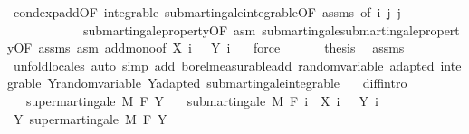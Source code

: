 \begin{isabellebody}
\ cond{\isacharunderscore}{\kern0pt}exp{\isacharunderscore}{\kern0pt}add{\isacharbrackleft}{\kern0pt}OF\ integrable\ submartingale{\isachardot}{\kern0pt}integrable{\isacharbrackleft}{\kern0pt}OF\ assms{\isacharbrackright}{\kern0pt}{\isacharcomma}{\kern0pt}\ of\ i\ j\ j{\isacharbrackright}{\kern0pt}\ \isanewline
\ \ \ \ \ \ \ \ \ \ \ \ submartingale{\isacharunderscore}{\kern0pt}property{\isacharbrackleft}{\kern0pt}OF\ asm{\isacharbrackright}{\kern0pt}\ submartingale{\isachardot}{\kern0pt}submartingale{\isacharunderscore}{\kern0pt}property{\isacharbrackleft}{\kern0pt}OF\ assms\ asm{\isacharbrackright}{\kern0pt}\ add{\isacharunderscore}{\kern0pt}mono{\isacharbrackleft}{\kern0pt}of\ {\isachardoublequoteopen}X\ i\ {\isacharunderscore}{\kern0pt}{\isachardoublequoteclose}\ {\isacharunderscore}{\kern0pt}\ {\isachardoublequoteopen}Y\ i\ {\isacharunderscore}{\kern0pt}{\isachardoublequoteclose}{\isacharbrackright}{\kern0pt}\ \isamarkupfalse%
\ force\isanewline
\ \ \isacommand{{\isacharbraceright}{\kern0pt}}\isamarkupfalse%
\isanewline
\ \ \isamarkupfalse%
\ {\isacharquery}{\kern0pt}thesis\ \isamarkupfalse%
\ assms\ \isamarkupfalse%
\ {\isacharparenleft}{\kern0pt}unfold{\isacharunderscore}{\kern0pt}locales{\isacharparenright}{\kern0pt}\ {\isacharparenleft}{\kern0pt}auto\ simp\ add{\isacharcolon}{\kern0pt}\ borel{\isacharunderscore}{\kern0pt}measurable{\isacharunderscore}{\kern0pt}add\ random{\isacharunderscore}{\kern0pt}variable\ adapted\ integrable\ Y{\isachardot}{\kern0pt}random{\isacharunderscore}{\kern0pt}variable\ Y{\isachardot}{\kern0pt}adapted\ submartingale{\isachardot}{\kern0pt}integrable{\isacharparenright}{\kern0pt}\ \ \isanewline
{}\isamarkupfalse%
%
\endisatagproof
{\isafoldproof}%
%
\isadelimproof
\isanewline
%
\endisadelimproof
\isanewline
{}\isamarkupfalse%
\ diff{\isacharbrackleft}{\kern0pt}intro{\isacharbrackright}{\kern0pt}{\isacharcolon}{\kern0pt}\isanewline
\ \ \ {\isachardoublequoteopen}supermartingale\ M\ F\ Y{\isachardoublequoteclose}\isanewline
\ \ \ {\isachardoublequoteopen}submartingale\ M\ F\ {\isacharparenleft}{\kern0pt}{\isasymlambda}i\ {\isasymxi}{\isachardot}{\kern0pt}\ X\ i\ {\isasymxi}\ {\isacharminus}{\kern0pt}\ Y\ i\ {\isasymxi}{\isacharparenright}{\kern0pt}{\isachardoublequoteclose}\isanewline
%
\isadelimproof
%
\endisadelimproof
%
\isatagproof
{}\isamarkupfalse%
\ {\isacharminus}{\kern0pt}\isanewline
\ \ \isamarkupfalse%
\ Y{\isacharcolon}{\kern0pt}\ supermartingale\ M\ F\ Y\ \isamarkupfalse%

\end{isabellebody}
